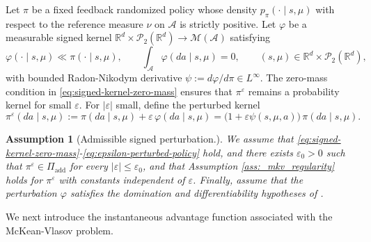 \documentclass[a4paper, 10pt, english, reqno]{amsart}
\newtheorem{assumptions}[theorem]{Assumption}
\begin{document}
Let $\pi$ be a fixed feedback randomized policy whose density
$p_\pi(\cdot\mid s,\mu)$ with respect to the reference measure $\nu$ on
$\mathcal A$ is strictly positive. Let $\varphi$ be a measurable signed
kernel $\mathbb R^d\times\mathcal P_2(\mathbb R^d)\to\mathcal M(\mathcal A)$
satisfying
\begin{equation}\label{eq:signed-kernel-zero-mass}
    \varphi(\cdot \mid s,\mu) \ll \pi(\cdot \mid s,\mu),
    \qquad
    \int_{\mathcal A}\varphi(da\mid s,\mu)=0,
    \qquad
    (s,\mu)\in\mathbb R^d\times\mathcal P_2(\mathbb R^d),
\end{equation}
with bounded Radon-Nikodym derivative
$\psi:=d\varphi/d\pi\in L^\infty$. The zero-mass condition in
\eqref{eq:signed-kernel-zero-mass} ensures that $\pi^\varepsilon$
remains a probability kernel for small $\varepsilon$. For $|\varepsilon|$
small, define the perturbed kernel
\begin{equation}\label{eq:epsilon-perturbed-policy}
    \pi^\varepsilon(da\mid s,\mu)
    :=\pi(da\mid s,\mu)+\varepsilon\,\varphi(da\mid s,\mu)
    =
    \bigl(1+\varepsilon\psi(s,\mu,a)\bigr)\,\pi(da\mid s,\mu).
\end{equation}

\begin{assumptions}[Admissible signed perturbation.]\label{ass:signed_perturbation}
    We assume that \eqref{eq:signed-kernel-zero-mass}-\eqref{eq:epsilon-perturbed-policy} hold, and there exists $\varepsilon_0>0$ such that
$\pi^\varepsilon\in\Pi_{\mathrm{add}}$ for every
$|\varepsilon|\leq\varepsilon_0$, and that Assumption \ref{ass:_mkv_regularity} holds
for $\pi^\varepsilon$ with constants independent of $\varepsilon$.
Finally, assume that the perturbation $\varphi$ satisfies the domination
and differentiability hypotheses of \cite[Theorem~4.6]{firstpaper}.
\end{assumptions}

We next introduce the instantaneous advantage function associated with
the McKean-Vlasov problem.
\end{document}
